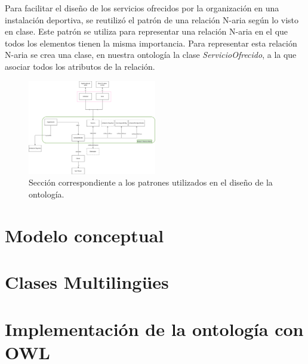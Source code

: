 \documentclass[a4paper,12pt]{article}
\begin{document}
	Para facilitar el diseño de los servicios ofrecidos por la organización en una instalación deportiva, se reutilizó el patrón de una relación N-aria según lo visto en clase. Este patrón se utiliza para representar una relación N-aria en el que todos los elementos tienen la misma importancia. Para representar esta relación N-aria se crea una clase, en nuestra ontología la clase \textit{ServicioOfrecido}, a la que asociar todos los atributos de la relación.
	
	\begin{figure}[H]
		\centering
		\includegraphics[width=0.5\textwidth]{include/patron.png}
		\caption{Sección correspondiente a los patrones utilizados en el diseño de la ontología.}
	\end{figure}
	
	
	\section{Modelo conceptual}
	
	\section{Clases Multilingües}
	
	\section{Implementación de la ontología con OWL}
	
\end{document}
